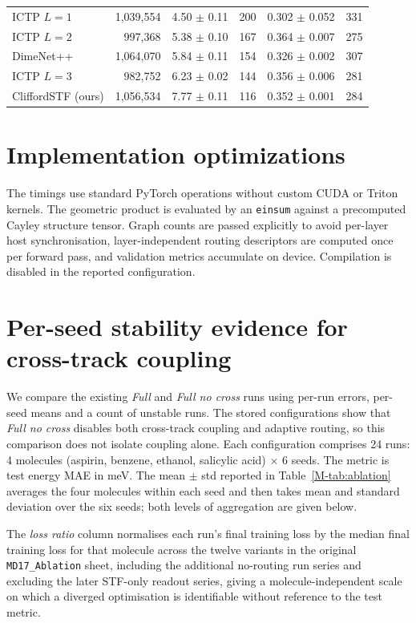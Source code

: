 \begin{table}[!htbp]
\begin{tabular}{lrrrrr}
ICTP $L{=}1$       & 1{,}039{,}554 & 4.50 $\pm$ 0.11 &   200 & 0.302 $\pm$ 0.052 &   331 \\
ICTP $L{=}2$       &   997{,}368 & 5.38 $\pm$ 0.10 &   167 & 0.364 $\pm$ 0.007 &   275 \\
DimeNet++          & 1{,}064{,}070 & 5.84 $\pm$ 0.11 &   154 & 0.326 $\pm$ 0.002 &   307 \\
ICTP $L{=}3$       &   982{,}752 & 6.23 $\pm$ 0.02 &   144 & 0.356 $\pm$ 0.006 &   281 \\
CliffordSTF (ours) & 1{,}056{,}534 & 7.77 $\pm$ 0.11 &   116 & 0.352 $\pm$ 0.001 &   284 \\
\bottomrule
\end{tabular}
\end{table}

\section{Implementation optimizations}\label{supp:optim}

The timings use standard PyTorch operations \citep{paszke2019pytorch} without custom CUDA or Triton kernels. The geometric product is evaluated by an \texttt{einsum} against a precomputed Cayley structure tensor. Graph counts are passed explicitly to avoid per-layer host synchronisation, layer-independent routing descriptors are computed once per forward pass, and validation metrics accumulate on device. Compilation is disabled in the reported configuration.

\section{Per-seed stability evidence for cross-track coupling}\label{supp:cross_stability}

We compare the existing \emph{Full} and \emph{Full no cross} runs using per-run errors, per-seed means and a count of unstable runs. The stored configurations show that \emph{Full no cross} disables both cross-track coupling and adaptive routing, so this comparison does not isolate coupling alone. Each configuration comprises 24 runs: 4 molecules (aspirin, benzene, ethanol, salicylic acid) $\times$ 6 seeds. The metric is test energy MAE in meV. The mean $\pm$ std reported in Table~\ref{M-tab:ablation} averages the four molecules within each seed and then takes mean and standard deviation over the six seeds; both levels of aggregation are given below.

The \emph{loss ratio} column normalises each run's final training loss by the median final training loss for that molecule across the twelve variants in the original \texttt{MD17\_Ablation} sheet, including the additional no-routing run series and excluding the later STF-only readout series, giving a molecule-independent scale on which a diverged optimisation is identifiable without reference to the test metric.

